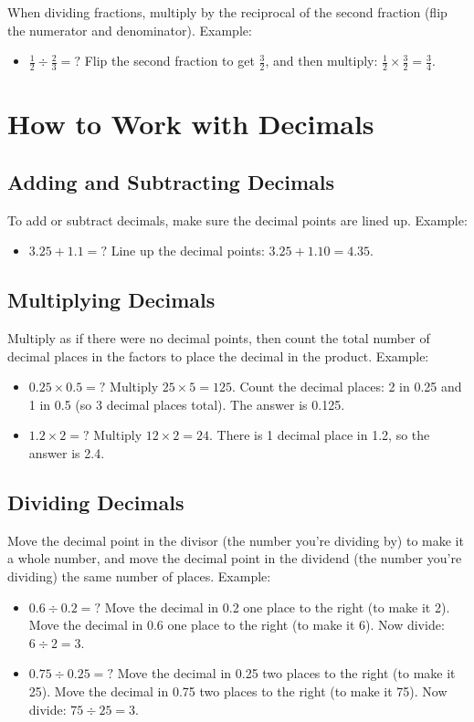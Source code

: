 When dividing fractions, multiply by the reciprocal of the second fraction (flip the numerator and denominator). Example:
\begin{itemize}
    \item $\frac{1}{2} \div \frac{2}{3} = ?$ Flip the second fraction to get $\frac{3}{2}$, and then multiply: $\frac{1}{2} \times \frac{3}{2} = \frac{3}{4}$.
\end{itemize}

\section{How to Work with Decimals}
\subsection{Adding and Subtracting Decimals}
To add or subtract decimals, make sure the decimal points are lined up. Example:
\begin{itemize}
    \item $3.25 + 1.1 = ?$ Line up the decimal points: $3.25 + 1.10 = 4.35$.
\end{itemize}

\subsection{Multiplying Decimals}
Multiply as if there were no decimal points, then count the total number of decimal places in the factors to place the decimal in the product. Example:
\begin{itemize}
    \item $0.25 \times 0.5 = ?$ Multiply $25 \times 5 = 125$. Count the decimal places: 2 in 0.25 and 1 in 0.5 (so 3 decimal places total). The answer is 0.125.
    \item $1.2 \times 2 = ?$ Multiply $12 \times 2 = 24$. There is 1 decimal place in 1.2, so the answer is 2.4.
\end{itemize}

\subsection{Dividing Decimals}
Move the decimal point in the divisor (the number you're dividing by) to make it a whole number, and move the decimal point in the dividend (the number you're dividing) the same number of places. Example:
\begin{itemize}
    \item $0.6 \div 0.2 = ?$ Move the decimal in 0.2 one place to the right (to make it 2). Move the decimal in 0.6 one place to the right (to make it 6). Now divide: $6 \div 2 = 3$.
    \item $0.75 \div 0.25 = ?$ Move the decimal in 0.25 two places to the right (to make it 25). Move the decimal in 0.75 two places to the right (to make it 75). Now divide: $75 \div 25 = 3$.
\end{itemize}

